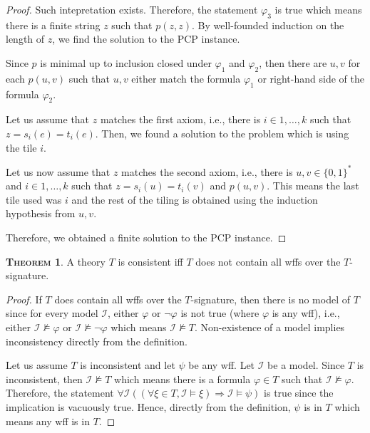 \documentclass{article}
\theoremstyle{definition}
\newtheorem{theorem}[definition]{\scshape Theorem}
\begin{document}
\begin{proof}
    Such intepretation exists. Therefore, the statement $\varphi_3$ is true which means there is a finite string $z$ such that $p(z, z)$. By well-founded induction on the length of $z$, we find the solution to the PCP instance.

    Since $p$ is minimal up to inclusion closed under $\varphi_1$ and $\varphi_2$, then there are $u, v$ for each $p(u, v)$ such that $u, v$ either match the formula $\varphi_1$ or right-hand side of the formula $\varphi_2$.

    Let us assume that $z$ matches the first axiom, i.e., there is $i \in 1, \ldots, k$ such that $z = s_i(e) = t_i(e)$. Then, we found a solution to the problem which is using the tile $i$.

    Let us now assume that $z$ matches the second axiom, i.e., there is $u, v \in \{0, 1\}^*$ and $i \in 1, \ldots, k$ such that $z = s_i(u) = t_i(v)$ and $p(u, v)$. This means the last tile used was $i$ and the rest of the tiling is obtained using the induction hypothesis from $u, v$.

    Therefore, we obtained a finite solution to the PCP instance.


\end{proof}

\begin{theorem}
   A theory $T$ is consistent iff $T$ does not contain all wffs over the $T$-signature.
\end{theorem}

\begin{proof}
    If $T$ does contain all wffs over the $T$-signature, then there is no model of $T$ since for every model $\mathcal{I}$, either $\varphi$ or $\neg \varphi$ is not true (where $\varphi$ is any wff), i.e., either $\mathcal{I} \not\vDash \varphi$ or $\mathcal{I} \not\vDash \neg\varphi$ which means $\mathcal{I} \not\vDash T$. Non-existence of a model implies inconsistency directly from the definition.

    Let us assume $T$ is inconsistent and let $\psi$ be any wff. Let $\mathcal{I}$ be a model. Since $T$ is inconsistent, then $\mathcal{I} \not\vDash T$ which means there is a formula $\varphi \in T$ such that $\mathcal{I} \not\vDash \varphi$. Therefore, the statement $\forall \mathcal{I} ((\forall \xi \in T, \mathcal{I} \vDash \xi) \Rightarrow \mathcal{I} \vDash \psi)$ is true since the implication is vacuously true. Hence, directly from the definition, $\psi$ is in $T$ which means any wff is in $T$.
\end{proof}
\end{document}
